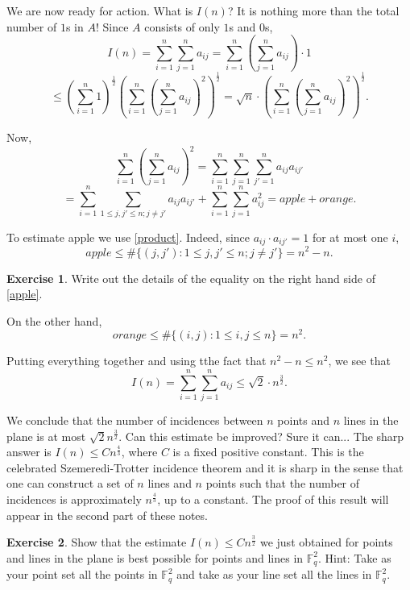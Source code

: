 \documentclass[]{stml-l}
\numberwithin{equation}{chapter}
\theoremstyle{plain}
\theoremstyle{definition}
\newtheorem{exercise}{Exercise}[chapter]
\theoremstyle{remark}
\begin{document}
We are now ready for action. What is $I(n)$? It is nothing more than the
total number of $1$s in $A$! Since $A$ consists of only $1$s and $0$s,
$$ I(n)=\sum_{i=1}^n \sum_{j=1}^n a_{ij}=\sum_{i=1}^n \left(\sum_{j=1}^n
a_{ij}\right) \cdot 1$$
$$ \leq {\left(\sum_{i=1}^n 1 \right)}^{\frac{1}{2}} {\left( \sum_{i=1}^n
{\left( \sum_{j=1}^n a_{ij} \right)}^2 \right)}^{\frac{1}{2}}=\sqrt{n}
\cdot {\left( \sum_{i=1}^n
{\left( \sum_{j=1}^n a_{ij} \right)}^2 \right)}^{\frac{1}{2}}. $$

Now,
$$ \sum_{i=1}^n
{\left( \sum_{j=1}^n a_{ij} \right)}^2=\sum_{i=1}^n \sum_{j=1}^n
\sum_{j'=1}^n a_{ij}a_{ij'}$$
$$=\sum_{i=1}^n \sum_{1 \leq j,j' \leq n; j \not=j'}
a_{ij}a_{ij'}+\sum_{i=1}^n \sum_{j=1}^n a_{ij}^2=apple+orange. $$

To estimate apple we use \ref{product}. Indeed, since $a_{ij} \cdot a_{ij'}=1$
for at most one $i$,
\begin{equation} \label{apple} apple \leq \# \{(j,j'): 1 \leq j,j' \leq n; j \not=j'\}=n^2-n.\end{equation}

\begin{exercise} Write out the details of the equality on the
right hand side of \ref{apple}. \end{exercise}


On the other hand,
$$ orange \leq \# \{(i,j): 1 \leq i,j \leq n\}=n^2. $$

Putting everything together and using tthe fact that $n^2-n \leq n^2$, we
see that
$$ I(n)=\sum_{i=1}^n \sum_{j=1}^n a_{ij} \leq \sqrt{2} \cdot
n^{\frac{3}{2}}. $$

We conclude that the number of incidences between $n$ points and $n$
lines in the plane is at most $\sqrt{2}n^{\frac{3}{2}}$. Can this
estimate be improved? Sure it can... The sharp answer is $I(n) \leq
Cn^{\frac{4}{3}}$, where $C$ is a fixed positive constant. This is the
celebrated Szemeredi-Trotter incidence theorem and it is sharp in the
sense that one can construct a set of $n$ lines and $n$ points such that
the number of incidences is approximately $n^{\frac{4}{3}}$, up to a
constant. The proof of this result will appear in the second part of
these notes.

\begin{exercise} Show that the estimate $I(n) \leq
Cn^{\frac{3}{2}}$ we just obtained for points and lines in the plane is
best possible for points and lines in ${\mathbb F}_q^2$. Hint: Take as your
point set all the points in ${\mathbb F}_q^2$ and take as your line set all
the lines in ${\mathbb F}_q^2$. \end{exercise}
\end{document}
